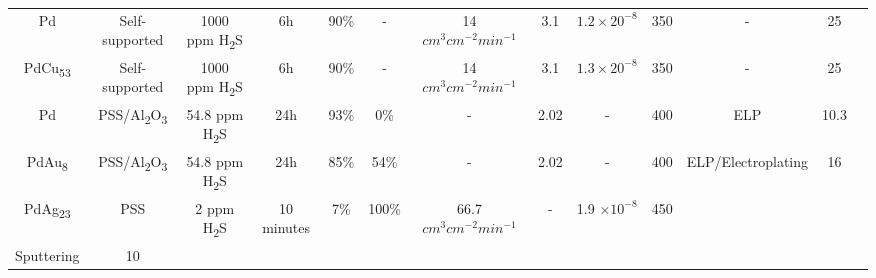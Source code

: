 \begin{longtable}{@{\extracolsep{\fill}}ccccccccccccc@{}}
    Pd                               & Self-supported               & 1000 ppm H\textsubscript{2}S & 6h          & 90\%               & -  & 14 $cm^3 cm^{-2} min^{-1}$       & 3.1                             & $1.2 \times 20^{-8}$           & 350                                    & -                   & 25                                                                                & \cite{OB2010}                  \\

    PdCu\textsubscript{53}                               & Self-supported               & 1000 ppm H\textsubscript{2}S & 6h          & 90\%               & -  & 14 $cm^3 cm^{-2} min^{-1}$       & 3.1                             & $1.3 \times 20^{-8}$           & 350                                    & -                   & 25                                                                                & \cite{OB2010}                  \\
    
    Pd                               & PSS/Al\textsubscript{2}O\textsubscript{3}               & 54.8 ppm H\textsubscript{2}S & 24h          & 93\%               & 0\%  & -       & 2.02                             & -           & 400                                    & ELP                   & 10.3                                                                                & \cite{Chen2010}                  \\

    PdAu\textsubscript{8}                               & PSS/Al\textsubscript{2}O\textsubscript{3}               & 54.8 ppm H\textsubscript{2}S & 24h          & 85\%               & 54\%  & -       & 2.02                             & -           & 400                                    & ELP/Electroplating                   & 16                                                                                & \cite{Chen2010}                  \\

    PdAg\textsubscript{23}                               & PSS               & 2 ppm H\textsubscript{2}S & 10 minutes          & 7\%               & 100\%  & 66.7 $cm^3 cm^{-2} min^{-1}$       & -                             & 1.9 $\times 10^{-8}$           & 450                                    & \begin{tabular}[c]{@{}c@{}}Magnetron \\ Sputtering\end{tabular}                   & 10                                                                                & \cite{Peters2016c}                  \\


\end{longtable}
